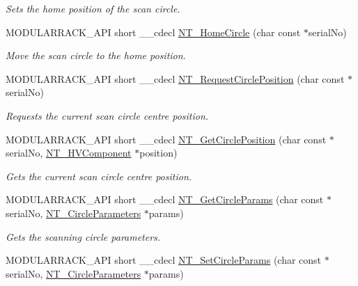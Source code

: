 \begin{DoxyCompactItemize}
\begin{DoxyCompactList}\small\item\em Sets the home position of the scan circle. \end{DoxyCompactList}\item 
M\+O\+D\+U\+L\+A\+R\+R\+A\+C\+K\+\_\+\+A\+PI short \+\_\+\+\_\+cdecl \hyperlink{group___modular_nano_trak_ga088d429f3c5ff6e972ebeba7f41d7f11}{N\+T\+\_\+\+Home\+Circle} (char const $\ast$serial\+No)
\begin{DoxyCompactList}\small\item\em Move the scan circle to the home position. \end{DoxyCompactList}\item 
M\+O\+D\+U\+L\+A\+R\+R\+A\+C\+K\+\_\+\+A\+PI short \+\_\+\+\_\+cdecl \hyperlink{group___modular_nano_trak_gad2b6b852873c4652d9a2f83f731cdd5f}{N\+T\+\_\+\+Request\+Circle\+Position} (char const $\ast$serial\+No)
\begin{DoxyCompactList}\small\item\em Requests the current scan circle centre position. \end{DoxyCompactList}\item 
M\+O\+D\+U\+L\+A\+R\+R\+A\+C\+K\+\_\+\+A\+PI short \+\_\+\+\_\+cdecl \hyperlink{group___modular_nano_trak_ga91756a2409571276808e6b977c9b9917}{N\+T\+\_\+\+Get\+Circle\+Position} (char const $\ast$serial\+No, \hyperlink{struct_n_t___h_v_component}{N\+T\+\_\+\+H\+V\+Component} $\ast$position)
\begin{DoxyCompactList}\small\item\em Gets the current scan circle centre position. \end{DoxyCompactList}\item 
M\+O\+D\+U\+L\+A\+R\+R\+A\+C\+K\+\_\+\+A\+PI short \+\_\+\+\_\+cdecl \hyperlink{group___modular_nano_trak_ga6cfa82babe50d8411b6a34dbe380e76d}{N\+T\+\_\+\+Get\+Circle\+Params} (char const $\ast$serial\+No, \hyperlink{struct_n_t___circle_parameters}{N\+T\+\_\+\+Circle\+Parameters} $\ast$params)
\begin{DoxyCompactList}\small\item\em Gets the scanning circle parameters. \end{DoxyCompactList}\item 
M\+O\+D\+U\+L\+A\+R\+R\+A\+C\+K\+\_\+\+A\+PI short \+\_\+\+\_\+cdecl \hyperlink{group___modular_nano_trak_ga6cf92024376a1af7a37e2444e40b50fe}{N\+T\+\_\+\+Set\+Circle\+Params} (char const $\ast$serial\+No, \hyperlink{struct_n_t___circle_parameters}{N\+T\+\_\+\+Circle\+Parameters} $\ast$params)

\end{DoxyCompactItemize}
